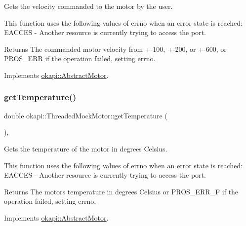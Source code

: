 Gets the velocity commanded to the motor by the user. 

This function uses the following values of errno when an error state is reached\+: E\+A\+C\+C\+ES -\/ Another resource is currently trying to access the port.

\begin{DoxyReturn}{Returns}
The commanded motor velocity from +-\/100, +-\/200, or +-\/600, or P\+R\+O\+S\+\_\+\+E\+RR if the operation failed, setting errno. 
\end{DoxyReturn}


Implements \mbox{\hyperlink{classokapi_1_1AbstractMotor_a96b02cca7b51f75c01d2d22aab474fe4}{okapi\+::\+Abstract\+Motor}}.

\mbox{\label{classokapi_1_1ThreadedMockMotor_ac84f4119ab3972237339d5bcf12c3f03}} 
\subsubsection{\texorpdfstring{getTemperature()}{getTemperature()}}
{\footnotesize\ttfamily double okapi\+::\+Threaded\+Mock\+Motor\+::get\+Temperature (\begin{DoxyParamCaption}{ }\end{DoxyParamCaption})\hspace{0.3cm}{\ttfamily [override]}, {\ttfamily [virtual]}}



Gets the temperature of the motor in degrees Celsius. 

This function uses the following values of errno when an error state is reached\+: E\+A\+C\+C\+ES -\/ Another resource is currently trying to access the port.

\begin{DoxyReturn}{Returns}
The motor\textquotesingle{}s temperature in degrees Celsius or P\+R\+O\+S\+\_\+\+E\+R\+R\+\_\+F if the operation failed, setting errno. 
\end{DoxyReturn}


Implements \mbox{\hyperlink{classokapi_1_1AbstractMotor_a96ef2dc7eeb1ac23713e3e37af9e95f2}{okapi\+::\+Abstract\+Motor}}.

\mbox{\label{classokapi_1_1ThreadedMockMotor_a29747007537750069d82e84b2f79232e}} 
